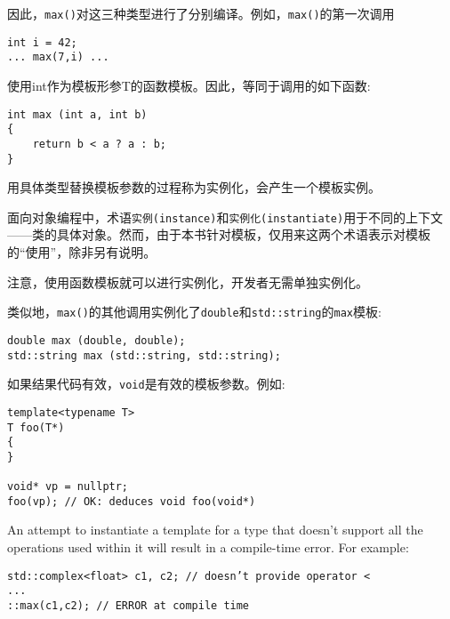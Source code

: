 因此，\texttt{max()}对这三种类型进行了分别编译。例如，\texttt{max()}的第一次调用

\begin{lstlisting}[style=styleCXX]
int i = 42;
... max(7,i) ...
\end{lstlisting}

使用int作为模板形参T的函数模板。因此，等同于调用的如下函数:

\begin{lstlisting}[style=styleCXX]
int max (int a, int b)
{
	return b < a ? a : b;
}
\end{lstlisting}

用具体类型替换模板参数的过程称为实例化，会产生一个模板实例。

\begin{tcolorbox}[colback=webgreen!5!white,colframe=webgreen!75!black]
\hspace*{0.75cm}面向对象编程中，术语\texttt{实例(instance)}和\texttt{实例化(instantiate)}用于不同的上下文——类的具体对象。然而，由于本书针对模板，仅用来这两个术语表示对模板的“使用”，除非另有说明。
\end{tcolorbox}

注意，使用函数模板就可以进行实例化，开发者无需单独实例化。

类似地，\texttt{max()}的其他调用实例化了\texttt{double}和\texttt{std::string}的\texttt{max}模板:

\begin{lstlisting}[style=styleCXX]
double max (double, double);
std::string max (std::string, std::string);
\end{lstlisting}

如果结果代码有效，\texttt{void}是有效的模板参数。例如:

\begin{lstlisting}[style=styleCXX]
template<typename T>
T foo(T*)
{
}

void* vp = nullptr;
foo(vp); // OK: deduces void foo(void*)
\end{lstlisting}


An attempt to instantiate a template for a type that doesn’t support all the operations used within it will result in a compile-time error. For example:

\begin{lstlisting}[style=styleCXX]
std::complex<float> c1, c2; // doesn’t provide operator <
...
::max(c1,c2); // ERROR at compile time
\end{lstlisting}

